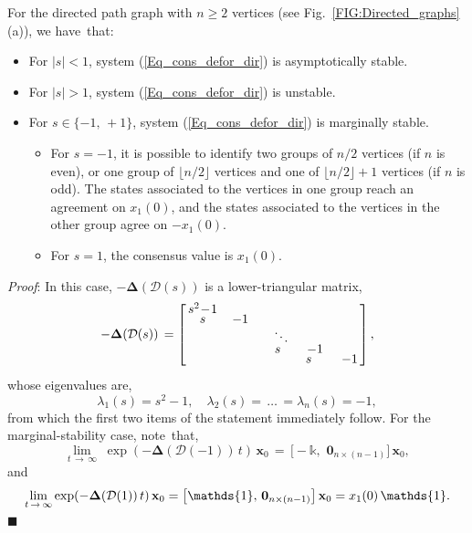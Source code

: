 \documentclass[letterpaper,9pt,twocolumn]{autart}
\newcommand{\vet}[1]{\ensuremath{{\mathbf #1}}}
\begin{document}
\begin{proposition}\label{Prop_DirPath}
For the directed path graph with $n \geq 2$ vertices (see Fig.~\ref{FIG:Directed_graphs}(a)), we have~that:
\begin{itemize}
\item For $|s| < 1$, system (\ref{Eq_cons_defor_dir}) is asymptotically stable.
\item For $|s| > 1$, system (\ref{Eq_cons_defor_dir}) is unstable.
\item For $s \in \{-1,\,+1\}$, system (\ref{Eq_cons_defor_dir}) is marginally stable.
\begin{itemize}
\item For $s = -1$, it is possible to identify two groups of $n/2$ vertices
(if $n$ is even), or one group of $\lfloor n/2 \rfloor$ vertices
and one of $\lfloor n/2 \rfloor + 1$ vertices (if $n$ is odd).
The states associated to the vertices in one group reach an agreement on $x_1(0)$,
and the states associated to the vertices in the other group
agree on $-x_1(0)$.
\item For $s = 1$, the consensus value is $x_1(0)$.
\end{itemize}
\end{itemize}
\emph{Proof}:
In this case, $-\boldsymbol{\Delta}(\mathcal{D}(s))$ is a lower-triangular \mbox{matrix},\vspace{-0.23cm}
$$
-\boldsymbol{\Delta}(\mathcal{D}(s)) \,= \left[\,
  \begin{matrix}
     s^2 \!-\! 1 & & & & &\vspace{-0.15cm}\\
     s &\, -1 & & & &\vspace{-0.1cm}\\
     & & &\ddots & &\vspace{-0.15cm}\\
     & & & s\;\; &\;\, -1 &\vspace{-0.15cm}\\
     & & & & s\;\; &\;\, -1
  \end{matrix}
\,\right],
$$
whose eigenvalues are,
$$
\lambda_{1}(s) = s^2-1,\quad \lambda_2(s) =\, \ldots \,= \lambda_{n}(s) = -1,
$$
from which the first two items of the statement \mbox{immediately}
follow. For the marginal-stability case, note~that,
$$
\lim_{t \,\rightarrow \, \infty}\; \exp(-\boldsymbol{\Delta}(\mathcal{D}(-1))\,t)\,\vet{x}_0 \,=\,
\big[\!-\mathds{k},\,\,\vet{0}_{n \times (n-1)}\big]\,\vet{x}_0,
$$
and
$$
\lim_{t \,\rightarrow \, \infty} \exp(-\boldsymbol{\Delta}(\mathcal{D}(1))\,t)\,\vet{x}_0 =
\big[\mathds{1},\,\vet{0}_{n \times (n-1)}\big]\,\vet{x}_0 = x_1(0)\,\mathds{1}.\vspace{-0.3cm}
$$
\hfill$\blacksquare$
\end{proposition}
\end{document}
